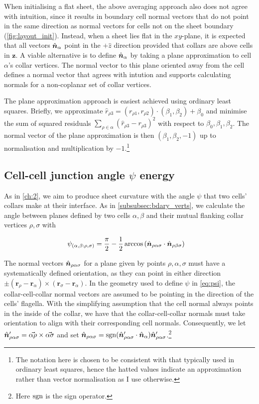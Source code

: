 When initialising a flat sheet, the above averaging approach also does not agree with intuition, since it results in boundary cell normal vectors that do not point in the same direction as normal vectors for cells not on the sheet boundary (\cref{fig:layout_init}). Instead, when a sheet lies flat in the $xy$-plane, it is expected that all vectors $\hat{\bm{n}}_\alpha$ point in the $+\hat{z}$ direction provided that collars are above cells in $\bm{z}$. 
A viable alternative is to define $\hat{\bm{n}}_\alpha$ by taking a plane approximation to cell $\alpha$'s collar vertices. 
The normal vector to this plane oriented away from the cell defines a normal vector that agrees with intution and supports calculating normals for a non-coplanar set of collar vertices.

The plane approximation approach is easiest achieved using ordinary least squares. 
Briefly, we approximate $\hat{r}_{\rho 3} = (r_{\rho 1}, r_{\rho 2}) \cdot (\beta_1, \beta_2) + \beta_0$ and minimise the sum of squared residuals $\sum_{\rho\in\alpha} (\hat{r}_{\rho 3} - r_{\rho 3})^2$ with respect to $\beta_0, \beta_1, \beta_2$. 
The normal vector of the plane approximation is then $(\beta_1, \beta_2, -1)$ up to normalisation and multiplication by $-1$.\footnote{The notation here is chosen to be consistent with that typically used in ordinary least squares, hence the hatted values indicate an approximation rather than vector normalisation as I use otherwise.} 

\subsection{Cell-cell junction angle $\psi$ energy} \label{subsec:e_psi}

As in \cref{ch:2}, we aim to produce sheet curvature with the angle $\psi$ that two cells' collars make at their interface. As in \cref{subsubsec:bdary_verts}, we calculate the angle between planes defined by two cells $\alpha, \beta$ and their mutual flanking collar vertices $\rho, \sigma$ with

\begin{align}
	\psi_{(\alpha, \beta: \rho, \sigma)} &= \frac{\pi}{2} - \frac{1}{2}\arccos \left(\hat{\bm{n}}_{\rho\alpha\sigma} \cdot \hat{\bm{n}}_{\rho\beta\sigma} \right) \label{eq:psi}
\end{align}

The normal vectors $\hat{\bm{n}}_{\rho\alpha\sigma}$ for a plane given by points $\rho, \alpha, \sigma$ must have a systematically defined orientation, as they can point in either direction $\pm (\bm{r}_\rho - \bm{r}_\alpha) \times (\bm{r}_\sigma - \bm{r}_\alpha)$. 
In the geometry used to define $\psi$ in \cref{eq:psi}, the collar-cell-collar normal vectors are assumed to be pointing in the direction of the cells' flagella. 
With the simplifying assumption that the cell normal always points in the inside of the collar, we have that the collar-cell-collar normals must take orientation to align with their corresponding cell normals. 
Consequently, we let $\hat{\bm{n}}_{\rho\alpha\sigma}' = \vec{\alpha\rho} \times \vec{\alpha\sigma}$ and set $\hat{\bm{n}}_{\rho\alpha\sigma} = \operatorname{sgn} (\hat{\bm{n}}_{\rho\alpha\sigma}' \cdot \hat{\bm{n}}_\alpha) \hat{\bm{n}}_{\rho\alpha\sigma}'$.\footnote{Here $\operatorname{sgn}$ is the sign operator.}

